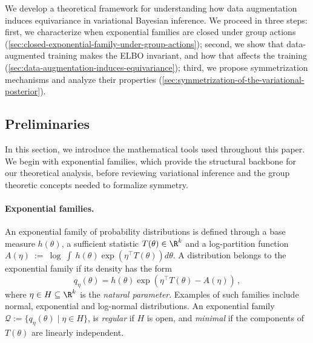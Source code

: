 \documentclass{article}
\begin{document}
We develop a theoretical framework for understanding how data augmentation induces equivariance in variational Bayesian inference. 
We proceed in three steps: first, we characterize when exponential families are closed under group actions (\cref{sec:closed-exponential-family-under-group-actions}); second, we show that data-augmented training
makes the ELBO invariant, and how that affects the training (\cref{sec:data-augmentation-induces-equivariance});
third, we propose
symmetrization mechanisms and analyze their properties (\cref{sec:symmetrization-of-the-variational-posterior}).

\subsection{Preliminaries}
\label{sec:preliminaries}

In this section, we introduce the mathematical tools used throughout this paper. We begin with exponential families, which provide the structural backbone for our theoretical analysis, before reviewing variational inference and the group theoretic concepts needed to formalize symmetry.

\paragraph{Exponential families.} An exponential family of probability distributions is defined through a base measure $h(\theta)$, a sufficient statistic $T(\theta)\in \R^k$ and a log-partition function $A(\eta)~:=~\log~\int~h(\theta) \exp(\eta^{\top} T(\theta)) d\theta$. A distribution belongs to the exponential family if its density has the form
\begin{equation}
    q_{\eta}(\theta) = h(\theta) \exp(\eta^{\top} T(\theta) - A(\eta))\,,
\end{equation}
where $\eta\in H \subseteq \R^k$ is the \emph{natural parameter}.
Examples of such families include normal, exponential and log-normal distributions.  An exponential family $\mathcal{Q} := \{q_{\eta}(\theta) \mid \eta \in H\}$,  is \emph{regular} if $H$ is open, and \emph{minimal} if the components of $T(\theta)$ are linearly independent.
\end{document}
